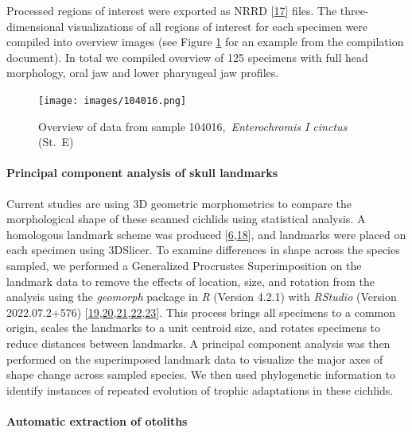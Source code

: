 Processed regions of interest were exported as NRRD {[}\protect\hyperlink{ref-12B4h087w}{17}{]} files.
The three-dimensional visualizations of all regions of interest for each specimen were compiled into overview images (see Figure \ref{fig:104016} for an example from the compilation document).
In total we compiled overview of 125 specimens with full head morphology, oral jaw and lower pharyngeal jaw profiles.

\begin{figure}
\hypertarget{fig:104016}{%
\centering
\texttt{[image: images/104016.png]}
\caption{Overview of data from sample 104016,~\emph{Enterochromis I cinctus} (St.~E)}\label{fig:104016}
}
\end{figure}

\hypertarget{principal-component-analysis-of-skull-landmarks}{%
\paragraph{Principal component analysis of skull landmarks}\label{principal-component-analysis-of-skull-landmarks}}

Current studies are using 3D geometric morphometrics to compare the morphological shape of these scanned cichlids using statistical analysis.
A homologous landmark scheme was produced {[}\protect\hyperlink{ref-BDrCSu8p}{6},\protect\hyperlink{ref-15FafMZm5}{18}{]}, and landmarks were placed on each specimen using 3DSlicer.
To examine differences in shape across the species sampled, we performed a Generalized Procrustes Superimposition on the landmark data to remove the effects of location, size, and rotation from the analysis using the \emph{geomorph} package in \emph{R} (Version 4.2.1) with \emph{RStudio} (Version 2022.07.2+576) {[}\protect\hyperlink{ref-VPUOQA2P}{19},\protect\hyperlink{ref-Ziptbtib}{20},\protect\hyperlink{ref-EwNL0C0Y}{21},\protect\hyperlink{ref-whEyWyQh}{22},\protect\hyperlink{ref-QfVloFVu}{23}{]}.
This process brings all specimens to a common origin, scales the landmarks to a unit centroid size, and rotates specimens to reduce distances between landmarks.
A principal component analysis was then performed on the superimposed landmark data to visualize the major axes of shape change across sampled species.
We then used phylogenetic information to identify instances of repeated evolution of trophic adaptations in these cichlids.

\hypertarget{automatic-extraction-of-otoliths}{%
\paragraph{Automatic extraction of otoliths}\label{automatic-extraction-of-otoliths}}


